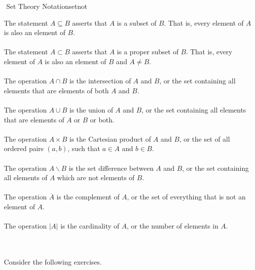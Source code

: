         \begin{definition}{\Stop\,\,Set Theory Notation}{setnot}
        
            The statement \(A\subseteq B\) asserts that \(A\) is a subset of \(B\). That is, every element of \(A\) is also an element of \(B\).
            \\
            \\
            The statement \(A\subset B\) asserts that \(A\) is a proper subset of \(B\). That is, every element of \(A\) is also an element of \(B\) and \(A\neq B\).
            \\
            \\
            The operation \(A\cap B\) is the intersection of \(A\) and \(B\), or the set containing all elements that are elements of both \(A\) and \(B\).
            \\
            \\
            The operation \(A\cup B\) is the union of \(A\) and \(B\), or the set containing all elements that are elements of \(A\) or \(B\) or both.
            \\
            \\
            The operation \(A\times B\) is the Cartesian product of \(A\) and \(B\), or the set of all ordered pairs \((a,b)\), such that \(a\in A\) and \(b\in B\).
            \\
            \\
            The operation \(A\backslash B\) is the set difference between \(A\) and \(B\), or the set containing all elements of \(A\) which are not elements of \(B\).
            \\
            \\
            The operation \(\overline{A}\) is the complement of \(A\), or the set of everything that is not an element of \(A\).
            \\
            \\
            The operation \(|A|\) is the cardinality of \(A\), or the number of elements in \(A\).
        
        \end{definition}
        \vphantom
        \\
        \\
        Consider the following exercises.
